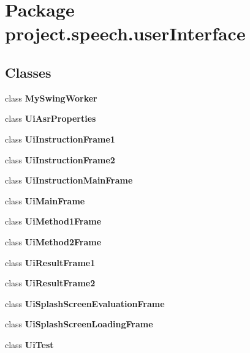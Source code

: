 \section{Package project.\+speech.\+user\+Interface}
\label{namespaceproject_1_1speech_1_1user_interface}
\subsection*{Classes}
\begin{DoxyCompactItemize}
\item 
class {\bfseries My\+Swing\+Worker}
\item 
class {\bf Ui\+Asr\+Properties}
\item 
class {\bf Ui\+Instruction\+Frame1}
\item 
class {\bf Ui\+Instruction\+Frame2}
\item 
class {\bf Ui\+Instruction\+Main\+Frame}
\item 
class {\bf Ui\+Main\+Frame}
\item 
class {\bf Ui\+Method1\+Frame}
\item 
class {\bf Ui\+Method2\+Frame}
\item 
class {\bf Ui\+Result\+Frame1}
\item 
class {\bf Ui\+Result\+Frame2}
\item 
class {\bf Ui\+Splash\+Screen\+Evaluation\+Frame}
\item 
class {\bf Ui\+Splash\+Screen\+Loading\+Frame}
\item 
class {\bf Ui\+Test}
\end{DoxyCompactItemize}
